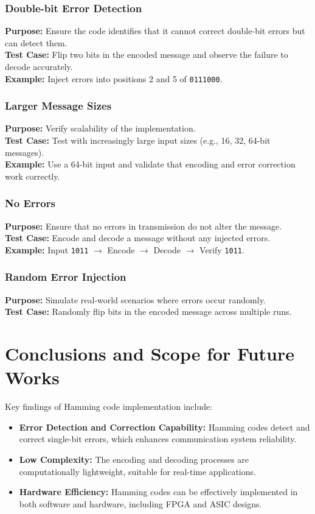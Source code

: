 \documentclass{article}
\numberwithin{equation}{section}
\numberwithin{figure}{section}
\numberwithin{table}{section}
\begin{document}
\subsubsection{Double-bit Error Detection}
\textbf{Purpose:} Ensure the code identifies that it cannot correct double-bit errors but can detect them. \\
\textbf{Test Case:} Flip two bits in the encoded message and observe the failure to decode accurately. \\
\textbf{Example:} Inject errors into positions 2 and 5 of \texttt{0111000}.

\subsubsection{Larger Message Sizes}
\textbf{Purpose:} Verify scalability of the implementation. \\
\textbf{Test Case:} Test with increasingly large input sizes (e.g., 16, 32, 64-bit messages). \\
\textbf{Example:} Use a 64-bit input and validate that encoding and error correction work correctly.

\subsubsection{No Errors}
\textbf{Purpose:} Ensure that no errors in transmission do not alter the message. \\
\textbf{Test Case:} Encode and decode a message without any injected errors. \\
\textbf{Example:} Input \texttt{1011} $\rightarrow$ Encode $\rightarrow$ Decode $\rightarrow$ Verify \texttt{1011}.


\subsubsection{Random Error Injection}
\textbf{Purpose:} Simulate real-world scenarios where errors occur randomly. \\
\textbf{Test Case:} Randomly flip bits in the encoded message across multiple runs. \\

\pagebreak
    
\section{\centering Conclusions and Scope for Future Works}
Key findings of Hamming code implementation include:
\begin{itemize}
    \item \textbf{Error Detection and Correction Capability:} Hamming codes detect and correct single-bit errors, which enhances communication system reliability.
    \item \textbf{Low Complexity:} The encoding and decoding processes are computationally lightweight, suitable for real-time applications.
    \item \textbf{Hardware Efficiency:} Hamming codes can be effectively implemented in both software and hardware, including FPGA and ASIC designs.
\end{itemize}
\end{document}
